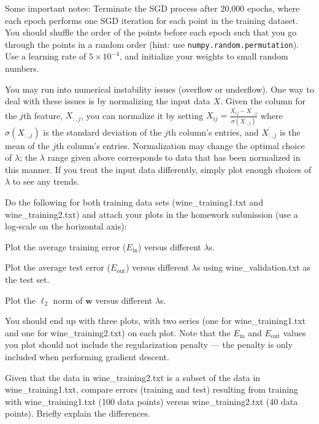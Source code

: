 \documentclass{article}
\begin{document}
Some important notes: Terminate the SGD process after 20,000 epochs, where each epoch performs one SGD iteration for each point in the training dataset. You should shuffle the order of the points before each epoch such that you go through the points in a random order (hint: use \texttt{numpy.random.permutation}). Use a learning rate of $5 \times 10^{-4}$, and initialize your weights to small random numbers. 

You may run into numerical instability issues (overflow or underflow). One way to deal with these issues is by normalizing the input data $X$. Given the column for the $j$th feature, $X_{:,j}$, you can normalize it by setting $X_{ij} = \frac{X_{ij} - \overline{X_{:,j}} }{\sigma(X_{:,j})}$ where $\sigma(X_{:,j})$ is the standard deviation of the $j$th column's entries, and $\overline{X_{:,j}}$ is the mean of the $j$th column's entries. Normalization may change the optimal choice of $\lambda$; the $\lambda$ range given above corresponds to data that has been normalized in this manner. If you treat the input data differently, simply plot enough choices of $\lambda$ to see any trends.

\problem[16]
Do the following for both training data sets (wine\_training1.txt and wine\_training2.txt) and attach your plots in the homework submission (use a log-scale on the horizontal axis):

\subproblem Plot the average training error ($E_\text{in}$) versus different $\lambda$s.

\subproblem Plot the average test error ($E_\text{out}$) versus different $\lambda$s using wine\_validation.txt as the test set.

\subproblem Plot the $\ell_2$ norm of $\mathbf{w}$ versus different $\lambda$s. \medskip

 You should end up with three plots, with two series (one for wine\_training1.txt and one for wine\_training2.txt) on each plot. Note that the $E_\text{in}$ and $E_\text{out}$ values you plot should not include the regularization penalty --- the penalty is only included when performing gradient descent.

\begin{solution}

\end{solution}

\problem[4]
Given that the data in wine\_training2.txt is a subset of the data in wine\_training1.txt, compare errors (training and test) resulting from training with wine\_training1.txt (100 data points) versus wine\_training2.txt (40 data points). Briefly explain the differences.
\end{document}
